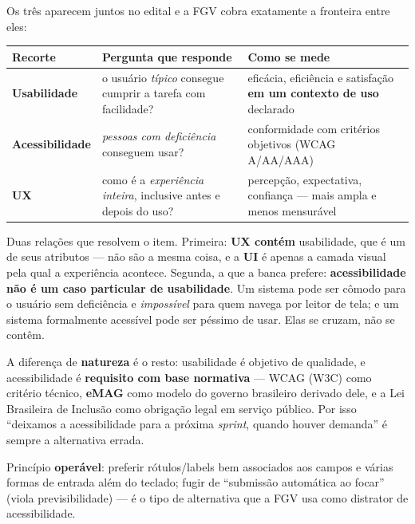 \begin{conceito}
Os três aparecem juntos no edital e a FGV cobra exatamente a fronteira entre
eles:

\begin{center}
\begin{tabular}{@{}p{2.9cm}p{4cm}p{4.5cm}@{}}
\toprule
\textbf{Recorte} & \textbf{Pergunta que responde} & \textbf{Como se mede} \\
\midrule
\textbf{Usabilidade} & o usuário \emph{típico} consegue cumprir a tarefa com
facilidade? & eficácia, eficiência e satisfação \textbf{em um contexto de uso}
declarado \\
\textbf{Acessibilidade} & \emph{pessoas com deficiência} conseguem usar? &
conformidade com critérios objetivos (WCAG A/AA/AAA) \\
\textbf{UX} & como é a \emph{experiência inteira}, inclusive antes e depois do
uso? & percepção, expectativa, confiança --- mais ampla e menos mensurável \\
\bottomrule
\end{tabular}
\end{center}

Duas relações que resolvem o item. Primeira: \textbf{UX contém} usabilidade,
que é um de seus atributos --- não são a mesma coisa, e a \textbf{UI} é apenas
a camada visual pela qual a experiência acontece. Segunda, a que a banca
prefere: \textbf{acessibilidade não é um caso particular de usabilidade}. Um
sistema pode ser cômodo para o usuário sem deficiência e \emph{impossível} para
quem navega por leitor de tela; e um sistema formalmente acessível pode ser
péssimo de usar. Elas se cruzam, não se contêm.

A diferença de \textbf{natureza} é o resto: usabilidade é objetivo de
qualidade, e acessibilidade é \textbf{requisito com base normativa} --- WCAG
(W3C) como critério técnico, \textbf{eMAG} como modelo do governo brasileiro
derivado dele, e a Lei Brasileira de Inclusão como obrigação legal em serviço
público. Por isso ``deixamos a acessibilidade para a próxima
\emph{sprint}, quando houver demanda'' é sempre a alternativa errada.
\end{conceito}

\begin{comosair}
Princípio \textbf{operável}: preferir rótulos/labels bem associados aos
campos e várias formas de entrada além do teclado; fugir de ``submissão
automática ao focar'' (viola previsibilidade) --- é o tipo de alternativa que
a FGV usa como distrator de acessibilidade.
\end{comosair}

